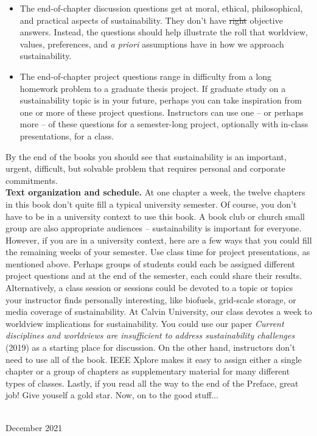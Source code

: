 {\begin{itemize}
\item The end-of-chapter discussion questions get at moral, ethical, philosophical,
and practical aspects of sustainability. They don't have \sout{right} objective 
answers. Instead, the questions should help illustrate the roll that worldview, 
values, preferences, and \emph{a priori} assumptions have in how we approach sustainability. 
\item The end-of-chapter project questions range in difficulty from a long
homework problem to a graduate thesis project. If graduate study on a sustainability
topic is in your future, perhaps you can take inspiration from one or more of 
these project questions. Instructors can use one -- or perhaps more -- of these 
questions for a semester-long project, optionally with in-class presentations, for a class.
\end{itemize}
By the end of the books you should see that sustainability is an important, 
urgent, difficult, but solvable problem that requires personal and corporate 
commitments. \\

\textbf{Text organization and schedule.} At one chapter a week, the twelve chapters
in this book don't quite fill a typical university semester. Of course, you don't
have to be in a university context to use this book. A book club or church small group 
are also appropriate audiences -- sustainability is important for everyone. However,
if you are in a university context, here are a few ways that you could fill the 
remaining weeks of your semester. Use class time for project presentations, as
mentioned above. Perhaps groups of students could each be assigned different 
project questions and at the end of the semester, each could share their results.
Alternatively, a class session or sessions could be devoted to a topic or topics your instructor
finds personally interesting, like biofuels, grid-scale storage, or media coverage
of sustainability. At Calvin University, our class devotes a week to worldview
implications for sustainability. You could use our paper \emph{Current disciplines 
and worldviews are insufficient to address sustainability challenges} (2019) as a 
starting place for discussion. %
On the other hand, instructors don't need to use all of the book. IEEE Xplore
makes it easy to assign either a single chapter or a group of chapters as supplementary
material for many different types of classes.
Lastly, if you read all the way to the end of the Preface, great job! Give youself a 
gold star. Now, on to the good stuff...


\vspace*{2pc}
\noindent\AUTHORS\\
\noindent December 2021
}

